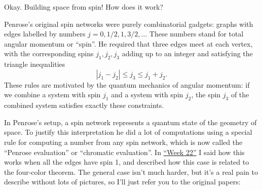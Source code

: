 \documentclass{article}
\renewcommand{\texttt}[1]{%
  \begingroup
  \ttfamily
  \begingroup\lccode`~=`/\lowercase{\endgroup\def~}{/\discretionary{}{}{}}%
  \begingroup\lccode`~=`[\lowercase{\endgroup\def~}{[\discretionary{}{}{}}%
  \begingroup\lccode`~=`.\lowercase{\endgroup\def~}{.\discretionary{}{}{}}%
  \catcode`/=\active\catcode`[=\active\catcode`.=\active
  \scantokens{#1\noexpand}%
  \endgroup
}
\begin{document}
Okay. Building space from spin! How does it work?

Penrose's original spin networks were purely combinatorial gadgets:
graphs with edges labelled by numbers \(j = 0, 1/2, 1, 3/2,\ldots\)
These numbers stand for total angular momentum or ``spin''. He required
that three edges meet at each vertex, with the corresponding spins
\(j_1, j_2, j_3\) adding up to an integer and satisfying the triangle
inequalities \[|j_1 - j_2| \leqslant j_3 \leqslant j_1 + j_2.\] These
rules are motivated by the quantum mechanics of angular momentum: if we
combine a system with spin \(j_1\) and a system with spin \(j_2\), the
spin \(j_3\) of the combined system satisfies exactly these constraints.

In Penrose's setup, a spin network represents a quantum state of the
geometry of space. To justify this interpretation he did a lot of
computations using a special rule for computing a number from any spin
network, which is now called the ``Penrose evaluation'' or ``chromatic
evaluation''. In \protect\hyperlink{week22}{``Week 22''} I said how this
works when all the edges have spin 1, and described how this case is
related to the four-color theorem. The general case isn't much harder,
but it's a real pain to describe without lots of pictures, so I'll just
refer you to the original papers:

\end{document}
